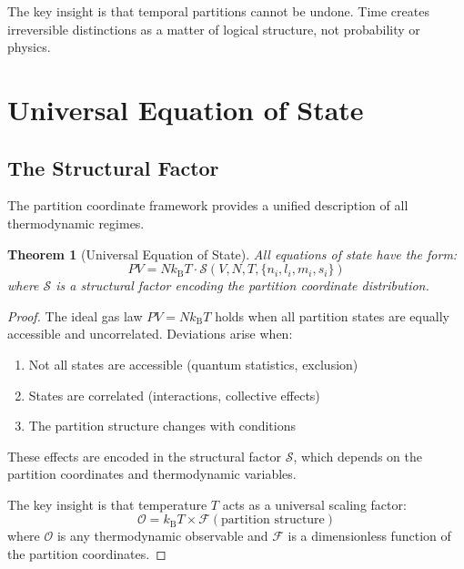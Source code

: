 \documentclass[twocolumn,10pt,a4paper]{article}
\newtheorem{theorem}{Theorem}[section]
\theoremstyle{definition}
\theoremstyle{remark}
\newcommand{\kB}{k_{\mathrm{B}}}
\begin{document}
The key insight is that temporal partitions cannot be undone. Time creates irreversible distinctions as a matter of logical structure, not probability or physics.

\section{Universal Equation of State}
\label{sec:eos}

\subsection{The Structural Factor}

The partition coordinate framework provides a unified description of all thermodynamic regimes.

\begin{theorem}[Universal Equation of State]
\label{thm:eos}
All equations of state have the form:
\begin{equation}
    \boxed{PV = N\kB T \cdot \mathcal{S}(V, N, T, \{n_i, l_i, m_i, s_i\})}
\end{equation}
where $\mathcal{S}$ is a structural factor encoding the partition coordinate distribution.
\end{theorem}

\begin{proof}
The ideal gas law $PV = N\kB T$ holds when all partition states are equally accessible and uncorrelated. Deviations arise when:
\begin{enumerate}
    \item Not all states are accessible (quantum statistics, exclusion)
    \item States are correlated (interactions, collective effects)
    \item The partition structure changes with conditions
\end{enumerate}

These effects are encoded in the structural factor $\mathcal{S}$, which depends on the partition coordinates and thermodynamic variables.

The key insight is that temperature $T$ acts as a universal scaling factor:
\begin{equation}
    \mathcal{O} = \kB T \times \mathcal{F}(\text{partition structure})
\end{equation}
where $\mathcal{O}$ is any thermodynamic observable and $\mathcal{F}$ is a dimensionless function of the partition coordinates.
\end{proof}
\end{document}
